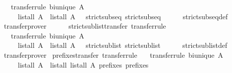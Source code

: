 \begin{isabellebody}
\ \ \ {\isacharbrackleft}transfer{\isacharunderscore}rule{\isacharbrackright}{\isacharcolon}\ {\isachardoublequoteopen}bi{\isacharunderscore}unique\ A{\isachardoublequoteclose}\isanewline
\ \ \ \ \ {\isachardoublequoteopen}{\isacharparenleft}list{\isacharunderscore}all{}\ A\ {\isacharequal}{\isacharequal}{\isacharequal}{\isachargreater}\ list{\isacharunderscore}all{}\ A\ {\isacharequal}{\isacharequal}{\isacharequal}{\isachargreater}\ {\isacharparenleft}{\isacharequal}{\isacharparenright}{\isacharparenright}\ strict{\isacharunderscore}subseq\ strict{\isacharunderscore}subseq{\isachardoublequoteclose}\ \ \isanewline
%
\isadelimproof
\ \ %
\endisadelimproof
%
\isatagproof
{}\isamarkupfalse%
\ strict{\isacharunderscore}subseq{\isacharunderscore}def\ \isamarkupfalse%
\ transfer{\isacharunderscore}prover%
\endisatagproof
{\isafoldproof}%
%
\isadelimproof
\isanewline
%
\endisadelimproof
\ \ \ \ \isanewline
{}\isamarkupfalse%
\ strict{\isacharunderscore}sublist{\isacharunderscore}transfer\ {\isacharbrackleft}transfer{\isacharunderscore}rule{\isacharbrackright}{\isacharcolon}\isanewline
\ \ \ {\isacharbrackleft}transfer{\isacharunderscore}rule{\isacharbrackright}{\isacharcolon}\ {\isachardoublequoteopen}bi{\isacharunderscore}unique\ A{\isachardoublequoteclose}\isanewline
\ \ \ \ \ {\isachardoublequoteopen}{\isacharparenleft}list{\isacharunderscore}all{}\ A\ {\isacharequal}{\isacharequal}{\isacharequal}{\isachargreater}\ list{\isacharunderscore}all{}\ A\ {\isacharequal}{\isacharequal}{\isacharequal}{\isachargreater}\ {\isacharparenleft}{\isacharequal}{\isacharparenright}{\isacharparenright}\ strict{\isacharunderscore}sublist\ strict{\isacharunderscore}sublist{\isachardoublequoteclose}\ \ \isanewline
%
\isadelimproof
\ \ %
\endisadelimproof
%
\isatagproof
{}\isamarkupfalse%
\ strict{\isacharunderscore}sublist{\isacharunderscore}def\ \isamarkupfalse%
\ transfer{\isacharunderscore}prover%
\endisatagproof
{\isafoldproof}%
%
\isadelimproof
\isanewline
%
\endisadelimproof
\isanewline
{}\isamarkupfalse%
\ prefixes{\isacharunderscore}transfer\ {\isacharbrackleft}transfer{\isacharunderscore}rule{\isacharbrackright}{\isacharcolon}\isanewline
\ \ \ {\isacharbrackleft}transfer{\isacharunderscore}rule{\isacharbrackright}{\isacharcolon}\ {\isachardoublequoteopen}bi{\isacharunderscore}unique\ A{\isachardoublequoteclose}\isanewline
\ \ \ \ \ {\isachardoublequoteopen}{\isacharparenleft}list{\isacharunderscore}all{}\ A\ {\isacharequal}{\isacharequal}{\isacharequal}{\isachargreater}\ list{\isacharunderscore}all{}\ {\isacharparenleft}list{\isacharunderscore}all{}\ A{\isacharparenright}{\isacharparenright}\ prefixes\ prefixes{\isachardoublequoteclose}\isanewline

\end{isabellebody}
